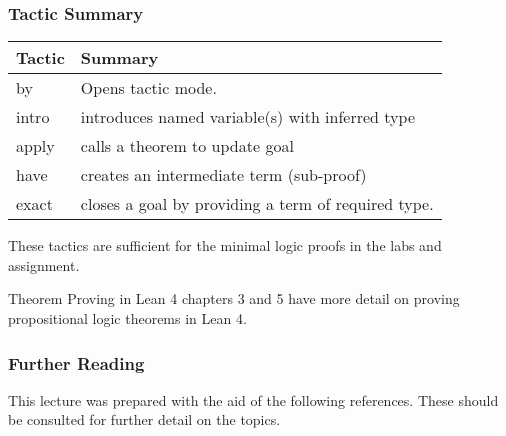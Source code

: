 \documentclass{beamer}
\theoremstyle{indentDefn} \newtheorem{defn}[]{Definition}
\begin{document}
\begin{frame}
	\frametitle{Tactic Summary}
	
	\begin{table}
    		\begin{tabular}{l | l}
			Tactic & Summary \\
			\hline
			by & Opens tactic mode. \\
			intro & introduces named variable(s) with inferred type \\
			apply & calls a theorem to update goal \\
			have & creates an intermediate term (sub-proof) \\
			exact & closes a goal by providing a term of required type.			
		\end{tabular}
	\end{table}
	
	These tactics are sufficient for the minimal logic proofs in the labs and assignment.
	
	Theorem Proving in Lean 4 chapters 3 and 5 have more detail on proving propositional logic theorems in Lean 4.

\end{frame}

%	
\begin{frame}
	\frametitle{Further Reading}
	
    This lecture was prepared with the aid of the following references. 
    These should be consulted for further detail on the topics. 

    \printbibliography
	
\end{frame}
\end{document}
